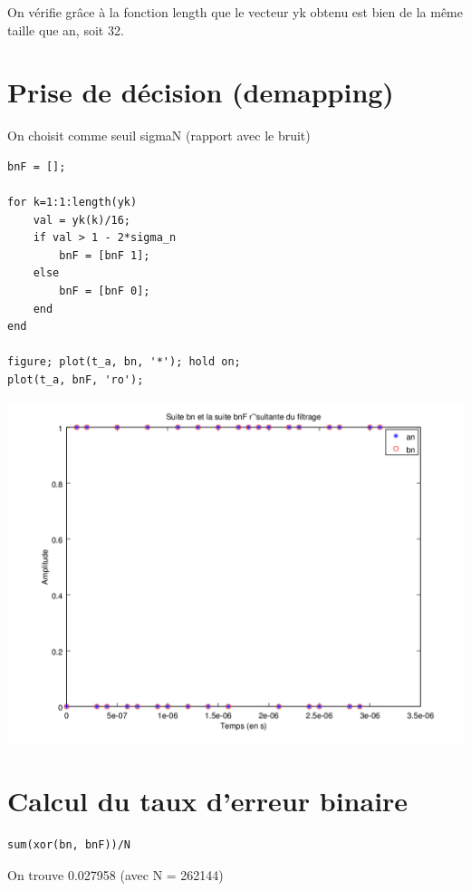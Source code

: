 \documentclass{acm_proc_article-sp}
\begin{document}
On vérifie grâce à la fonction length que le vecteur yk obtenu est bien de la même taille que an, soit 32.


\section{Prise de décision (demapping)}

On choisit comme seuil sigmaN (rapport avec le bruit)

\begin{center}
\begin{lstlisting}
bnF = [];

for k=1:1:length(yk)
    val = yk(k)/16;
    if val > 1 - 2*sigma_n
        bnF = [bnF 1];
    else
        bnF = [bnF 0];
    end
end

figure; plot(t_a, bn, '*'); hold on;
plot(t_a, bnF, 'ro');
\end{lstlisting}

\includegraphics[scale=0.45]{bn_bnF_14.png}
\end{center}

\section{Calcul du taux d'erreur binaire}

\begin{lstlisting}
sum(xor(bn, bnF))/N
\end{lstlisting}

On trouve 0.027958 (avec N = 262144)
\end{document}
